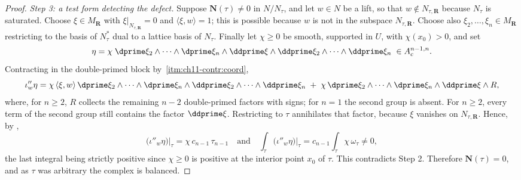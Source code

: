 \begin{proof}
\emph{Step 3: a test form detecting the defect.}
Suppose $\mathbf N(\tau)\neq0$ in $N/N_\tau$, and let
$w\in N$ be a lift, so that $w\notin N_{\tau,\mathbf R}$ because $N_\tau$ is
saturated.  Choose $\xi\in M_{\mathbf R}$ with
$\xi|_{N_{\tau,\mathbf R}}=0$ and $\langle\xi,w\rangle=1$; this is possible
because $w$ is not in the subspace $N_{\tau,\mathbf R}$.  Choose also
$\xi_2,\ldots,\xi_n\in M_{\mathbf R}$ restricting to the basis of
$N_\tau^*$ dual to a lattice basis of $N_\tau$.  Finally let
$\chi\ge0$ be smooth, supported in $U$, with $\chi(x_0)>0$, and set
\[
 \eta=\chi\;
   \dprime\xi_2\wedge\cdots\wedge\dprime\xi_n
   \wedge\ddprime\xi\wedge\ddprime\xi_2\wedge\cdots\wedge\ddprime\xi_n
 \;\in A^{n-1,n}_c .
\]
Contracting in the double-primed block by
\,\cref{itm:ch11-contr:coord},
\[
 \iota''_w\eta
 =\chi\,\langle\xi,w\rangle\,
   \dprime\xi_2\wedge\cdots\wedge\dprime\xi_n
   \wedge\ddprime\xi_2\wedge\cdots\wedge\ddprime\xi_n
  \;+\;\chi\,\dprime\xi_2\wedge\cdots\wedge\dprime\xi_n\wedge
     \ddprime\xi\wedge R,
\]
where, for $n\ge2$, $R$ collects the remaining $n-2$ double-primed factors
with signs; for $n=1$ the second group is absent.  For $n\ge2$,
every term of the second group still contains the factor $\ddprime\xi$.  Restricting to $\tau$ annihilates that factor, because
$\xi$ vanishes on $N_{\tau,\mathbf R}$.  Hence, by
,
\[
 \bigl(\iota''_w\eta\bigr)\big|_\tau
 =\chi\,c_{n-1}\,\tau_{n-1}
 \quad\text{and}\quad
 \int_\tau\bigl(\iota''_w\eta\bigr)\big|_\tau
 =c_{n-1}\int_\tau\chi\,\omega_\tau\neq0,
\]
the last integral being strictly positive since $\chi\ge0$ is positive at
the interior point $x_0$ of $\tau$.  This contradicts Step 2.  Therefore
$\mathbf N(\tau)=0$, and as $\tau$ was arbitrary the complex is balanced.
\end{proof}

